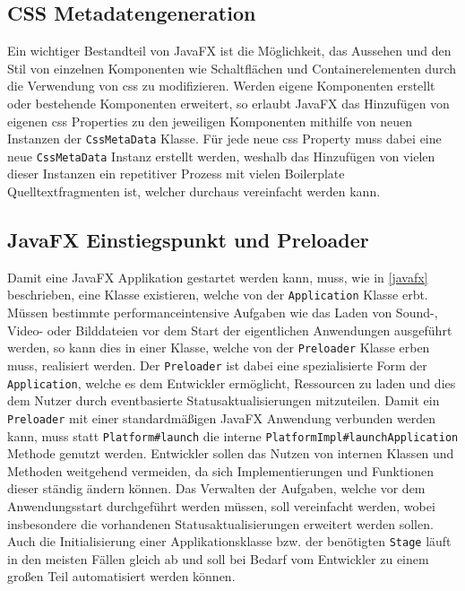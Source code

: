 \subsection{CSS Metadatengeneration}
Ein wichtiger Bestandteil von JavaFX ist die Möglichkeit, das Aussehen und den Stil von einzelnen Komponenten wie Schaltflächen und Containerelementen durch die Verwendung von \ac{css} zu modifizieren. Werden eigene Komponenten erstellt oder bestehende Komponenten erweitert, so erlaubt JavaFX das Hinzufügen von eigenen \ac{css} Properties zu den jeweiligen Komponenten mithilfe von neuen Instanzen der \texttt{CssMetaData} Klasse. Für jede neue \ac{css} Property muss dabei eine neue \texttt{CssMetaData} Instanz erstellt werden, weshalb das Hinzufügen von vielen dieser Instanzen ein repetitiver Prozess mit vielen Boilerplate Quelltextfragmenten ist, welcher durchaus vereinfacht werden kann.
\subsection{JavaFX Einstiegspunkt und Preloader}
Damit eine JavaFX Applikation gestartet werden kann, muss, wie in \autoref{javafx} beschrieben, 
eine Klasse existieren, welche von der \texttt{Application} Klasse erbt. Müssen bestimmte performanceintensive Aufgaben wie das Laden von Sound-, Video- oder Bilddateien vor dem Start der eigentlichen Anwendungen ausgeführt werden, so kann dies in einer Klasse, welche von der \texttt{Preloader} Klasse erben muss, realisiert werden. Der \texttt{Preloader} ist dabei eine spezialisierte Form der \texttt{Application}, welche es dem Entwickler ermöglicht, Ressourcen zu laden und dies dem Nutzer durch eventbasierte Statusaktualisierungen mitzuteilen. Damit ein \texttt{Preloader} mit einer standardmäßigen JavaFX Anwendung verbunden werden kann, muss statt \texttt{Platform\#launch} die interne \texttt{PlatformImpl\#launchApplication} Methode genutzt werden. Entwickler sollen das Nutzen von internen Klassen und Methoden weitgehend vermeiden, da sich Implementierungen und Funktionen dieser ständig ändern können. Das Verwalten der Aufgaben, welche vor dem Anwendungsstart durchgeführt werden müssen, soll vereinfacht werden, wobei insbesondere die vorhandenen Statusaktualisierungen erweitert werden sollen. Auch die Initialisierung einer Applikationsklasse bzw. der benötigten \texttt{Stage} läuft in den meisten Fällen gleich ab und soll bei Bedarf vom Entwickler zu einem großen Teil automatisiert werden können.
